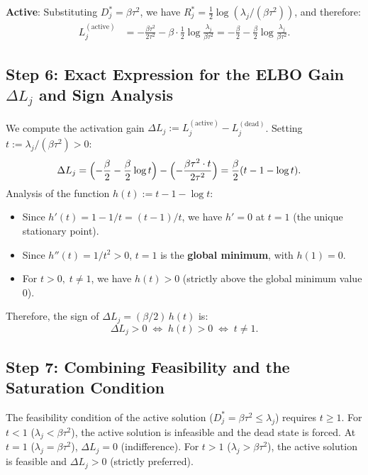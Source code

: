 \documentclass[make,article,submit,pdftex,moreauthors]{Definitions/mdpi}
\begin{document}
\textbf{Active}: Substituting $D_j^* = \beta\tau^2$, we have
$R_j^* = \tfrac{1}{2}\log(\lambda_j / (\beta\tau^2))$, and therefore:
\begin{align}
  L_j^{(\mathrm{active})}
  &= -\frac{\beta\tau^2}{2\tau^2} - \beta \cdot \frac{1}{2}\log\frac{\lambda_j}{\beta\tau^2}
   = -\frac{\beta}{2} - \frac{\beta}{2}\log\frac{\lambda_j}{\beta\tau^2}.
  \label{eq:Lj_active}
\end{align}

\subsection*{Step 6: Exact Expression for the ELBO Gain $\Delta L_j$ and Sign Analysis}

We compute the activation gain
$\Delta L_j := L_j^{(\mathrm{active})} - L_j^{(\mathrm{dead})}$.
Setting $t := \lambda_j / (\beta\tau^2) > 0$:
\begin{align}
  \Delta L_j
  &= \Bigl(-\frac{\beta}{2} - \frac{\beta}{2}\log t\Bigr) - \Bigl(-\frac{\beta\tau^2 \cdot t}{2\tau^2}\Bigr)
   = \frac{\beta}{2}(t - 1 - \log t).
  \label{eq:delta_L_exact}
\end{align}
Analysis of the function $h(t) := t - 1 - \log t$:
\begin{itemize}
  \item Since $h'(t) = 1 - 1/t = (t-1)/t$, we have $h' = 0$ at $t=1$ (the unique stationary point).
  \item Since $h''(t) = 1/t^2 > 0$, $t=1$ is the \textbf{global minimum}, with $h(1) = 0$.
  \item For $t > 0,\; t \neq 1$, we have $h(t) > 0$ (strictly above the global minimum value 0).
\end{itemize}
Therefore, the sign of $\Delta L_j = (\beta/2)\,h(t)$ is:
\begin{equation}
  \Delta L_j > 0
  \;\Longleftrightarrow\;
  h(t) > 0
  \;\Longleftrightarrow\;
  t \neq 1.
  \label{eq:delta_sign}
\end{equation}

\subsection*{Step 7: Combining Feasibility and the Saturation Condition}

The feasibility condition of the active solution
($D_j^* = \beta\tau^2 \leq \lambda_j$) requires $t \geq 1$.
For $t < 1$ ($\lambda_j < \beta\tau^2$), the active solution is infeasible and
the dead state is forced.
At $t = 1$ ($\lambda_j = \beta\tau^2$), $\Delta L_j = 0$ (indifference).
For $t > 1$ ($\lambda_j > \beta\tau^2$), the active solution is feasible and
$\Delta L_j > 0$ (strictly preferred).
\end{document}
